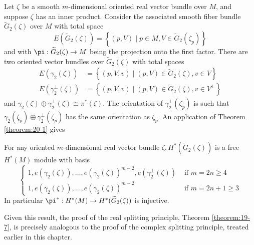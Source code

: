 Let $\zeta$ be a smooth $m$-dimensional oriented real vector bundle over $M$, and suppose $\zeta$ has an 
inner product. Consider the associated smooth fiber bundle $\widetilde{G}_{2}( \zeta )$ over $M$ with total space
\[
  E( {\widetilde{G}_{2}( \zeta ) })  = \left\{  {( {p,V})  \mid  p \in  M,V \in  \widetilde{G}_{2}( {\zeta }_{p}) }\right\}
\]
and with $\pi  : \widetilde{G}_{2}( \zeta )  \ra  M$ being the projection onto the first factor. There are 
two oriented vector bundles over $\widetilde{G}_{2}( \zeta )$ with total spaces
\begin{align*}
  E( {{\gamma }_{2}( \zeta ) })  
    & = \left\{  {( {p,V,v})  \mid  ( {p,V})  \in  \widetilde{G}_{2}( \zeta ),v \in  V}\right\}\\
  E( {{\gamma }_{2}^{ \bot  }( \zeta ) })  
    & = \left\{  {( {p,V,v})  \mid  ( {p,V})  \in  \widetilde{G}_{2}( \zeta ),v \in  {V}^{ \bot  }}\right\}
\end{align*}
and ${\gamma }_{2}( \zeta )  \oplus  {\gamma }_{2}^{ \bot  }( \zeta )  \cong  {\pi }^*( \zeta )$. The orientation 
of ${\gamma }_{2}^{ \bot  }( {\zeta }_{p})$ is such that ${\gamma }_{2}( {\zeta }_{p})  \oplus  {\gamma }_{2}^{ \bot  }( {\zeta }_{p})$ 
has the same orientation as ${\zeta }_{p}$. An application of Theorem \ref{theorem:20-1} gives


\begin{theorem}\label{theorem:20-11}
  For any oriented $m$-dimensional real vector bundle $\zeta,H^*( {\widetilde{G}_{2}( \zeta ) })$ is 
  a free $H^*( M)$ module with basis
  \[
    \left\{  \begin{array}{ll} 1,e( {{\gamma }_{2}( \zeta ) }),\ldots,e{( {\gamma }_{2}( \zeta ) ) }^{m- 2},e( {{\gamma }_{2}^{ \bot  }( \zeta ) }) & \text{ if }m = {2n} \geq  4 \\  1,e( {{\gamma }_{2}( \zeta ) }),\ldots,e{( {\gamma }_{2}( \zeta ) ) }^{m- 2} & \text{ if }m = {2n} + 1 \geq  3 \end{array}\right.
  \]
  In particular ${\pi }^* : H^*( M)  \ra  H^*( {\widetilde{G}_{2}( \zeta ) })$ is injective.
\end{theorem}

Given this result, the proof of the real splitting principle, Theorem \ref{theorem:19-7}, is precisely analogous to the 
proof of the complex splitting principle, treated earlier in this chapter.
